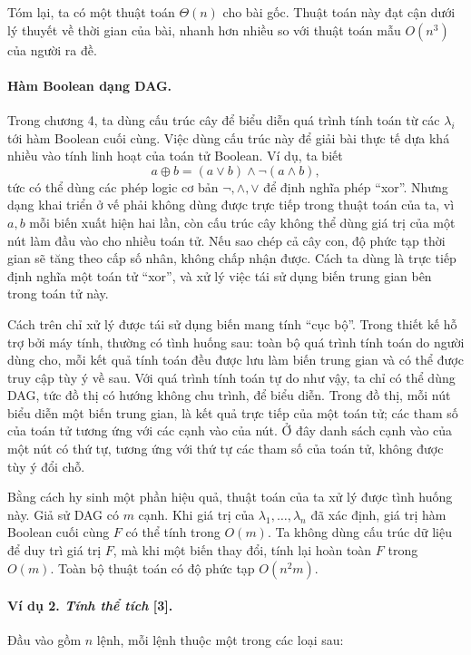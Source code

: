 \documentclass[11pt]{article}
\begin{document}
Tóm lại, ta có một thuật toán \(\Theta(n)\) cho bài gốc. Thuật toán này đạt
cận dưới lý thuyết về thời gian của bài, nhanh hơn nhiều so với thuật toán mẫu
\(O(n^3)\) của người ra đề.

\paragraph{Hàm Boolean dạng DAG.}
Trong chương 4, ta dùng cấu trúc cây để biểu diễn quá trình tính toán từ các
\(\lambda_i\) tới hàm Boolean cuối cùng. Việc dùng cấu trúc này để giải bài
thực tế dựa khá nhiều vào tính linh hoạt của toán tử Boolean. Ví dụ, ta biết
\[
  a\oplus b=(a\vee b)\wedge\neg(a\wedge b),
\]
tức có thể dùng các phép logic cơ bản \(\neg,\wedge,\vee\) để định nghĩa phép
``xor''. Nhưng dạng khai triển ở vế phải không dùng được trực tiếp trong thuật
toán của ta, vì \(a,b\) mỗi biến xuất hiện hai lần, còn cấu trúc cây không thể
dùng giá trị của một nút làm đầu vào cho nhiều toán tử. Nếu sao chép cả cây con,
độ phức tạp thời gian sẽ tăng theo cấp số nhân, không chấp nhận được. Cách ta
dùng là trực tiếp định nghĩa một toán tử ``xor'', và xử lý việc tái sử dụng
biến trung gian bên trong toán tử này.

Cách trên chỉ xử lý được tái sử dụng biến mang tính ``cục bộ''. Trong thiết kế
hỗ trợ bởi máy tính, thường có tình huống sau: toàn bộ quá trình tính toán do
người dùng cho, mỗi kết quả tính toán đều được lưu làm biến trung gian và có
thể được truy cập tùy ý về sau. Với quá trình tính toán tự do như vậy, ta chỉ
có thể dùng DAG, tức đồ thị có hướng không chu trình, để biểu diễn. Trong đồ
thị, mỗi nút biểu diễn một biến trung gian, là kết quả trực tiếp của một toán
tử; các tham số của toán tử tương ứng với các cạnh vào của nút. Ở đây danh sách
cạnh vào của một nút có thứ tự, tương ứng với thứ tự các tham số của toán tử,
không được tùy ý đổi chỗ.

Bằng cách hy sinh một phần hiệu quả, thuật toán của ta xử lý được tình huống
này. Giả sử DAG có \(m\) cạnh. Khi giá trị của
\(\lambda_1,\ldots,\lambda_n\) đã xác định, giá trị hàm Boolean cuối cùng
\(F\) có thể tính trong \(O(m)\). Ta không dùng cấu trúc dữ liệu để duy trì giá
trị \(F\), mà khi một biến thay đổi, tính lại hoàn toàn \(F\) trong \(O(m)\).
Toàn bộ thuật toán có độ phức tạp \(O(n^2m)\).

\paragraph{Ví dụ 2. \emph{Tính thể tích} [3].}
Đầu vào gồm \(n\) lệnh, mỗi lệnh thuộc một trong các loại sau:
\end{document}
